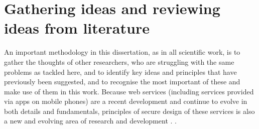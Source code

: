 \section{Gathering ideas and reviewing ideas from literature}


An important methodology in this dissertation, as in all scientific work, is to gather the thoughts of other researchers, who are struggling with the same problems as tackled here, and to identify key ideas and principles that have previously been suggested, and to recognise the most important of these and make use of them in this work.
\if
Because web services (including services provided via apps on mobile phones)
are a recent development and continue to evolve in both details and fundamentals,
principles of secure design of these services is also a new and evolving area of
research and development \cite{AddieColman2010,Addie_Moffatt_Dekeyser_Colman2011}.
\else\cite{Addie_Moffatt_Dekeyser_Colman2011}.
\fi
